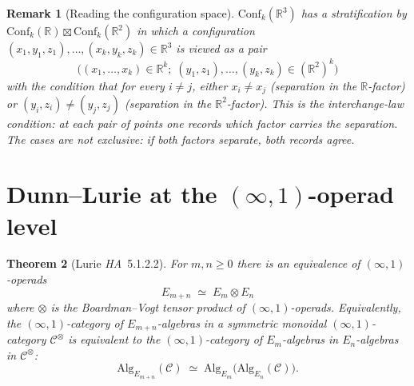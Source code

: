 \documentclass[11pt]{article}
\newtheorem{theorem}{Theorem}[section]
\newtheorem{remark}[theorem]{Remark}
\newcommand{\Conf}{\mathrm{Conf}}
\newcommand{\Alg}{\mathrm{Alg}}
\newcommand{\R}{\mathbb{R}}
\newcommand{\cC}{\mathcal{C}}
\begin{document}
\begin{remark}[Reading the configuration space]
$\Conf_{k}(\R^{3})$ has a stratification by $\Conf_{k}(\R) \boxtimes
\Conf_{k}(\R^{2})$ in which a configuration $(x_{1}, y_{1}, z_{1}), \ldots,
(x_{k}, y_{k}, z_{k}) \in \R^{3}$ is viewed as a pair
\[
  \bigl((x_{1}, \ldots, x_{k}) \in \R^{k} ; \;
  (y_{1}, z_{1}), \ldots, (y_{k}, z_{k}) \in (\R^{2})^{k}\bigr)
\]
with the condition that for every $i \neq j$, either $x_{i} \neq x_{j}$
(separation in the $\R$-factor) or $(y_{i}, z_{i}) \neq (y_{j}, z_{j})$
(separation in the $\R^{2}$-factor). This is the interchange-law
condition: at each pair of points one records which factor carries the
separation. The cases are not exclusive: if both factors separate, both
records agree.
\end{remark}

\section{Dunn--Lurie at the $(\infty, 1)$-operad level}
\label{sec:lurie-additivity}

\begin{theorem}[Lurie \emph{HA}~5.1.2.2]
\label{thm:lurie-additivity}
For $m, n \geq 0$ there is an equivalence of $(\infty, 1)$-operads
\[
  E_{m + n} \;\simeq\; E_{m} \otimes E_{n}
\]
where $\otimes$ is the Boardman--Vogt tensor product of
$(\infty, 1)$-operads. Equivalently, the $(\infty, 1)$-category of
$E_{m + n}$-algebras in a symmetric monoidal $(\infty, 1)$-category
$\cC^{\otimes}$ is equivalent to the $(\infty, 1)$-category of
$E_{m}$-algebras in $E_{n}$-algebras in $\cC^{\otimes}$:
\[
  \Alg_{E_{m + n}}(\cC) \;\simeq\;
  \Alg_{E_{m}}\bigl(\Alg_{E_{n}}(\cC)\bigr).
\]
\end{theorem}
\end{document}
